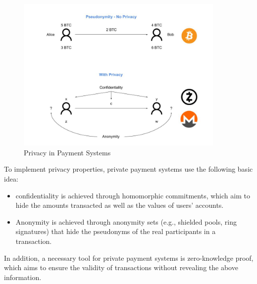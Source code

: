 \begin{figure}
    \centering
    \includegraphics[width=0.9\textwidth]{images/privacy/Anonymity in blockchain.jpg}
    \caption{Privacy in Payment Systems}
    \label{fig:privacy_img}
\end{figure}


To implement privacy properties, private payment systems use the following basic idea: 
\begin{itemize}
    \item confidentiality is achieved through homomorphic commitments, which aim to hide the amounts transacted as well as the values of users' accounts. 
    \item Anonymity is achieved through anonymity sets (e.g., shielded pools, ring signatures) that hide the pseudonyms of the real participants in a transaction.
\end{itemize} 
In addition, a necessary tool for private payment systems is zero-knowledge proof, which aims to ensure the validity of transactions without revealing the above information.